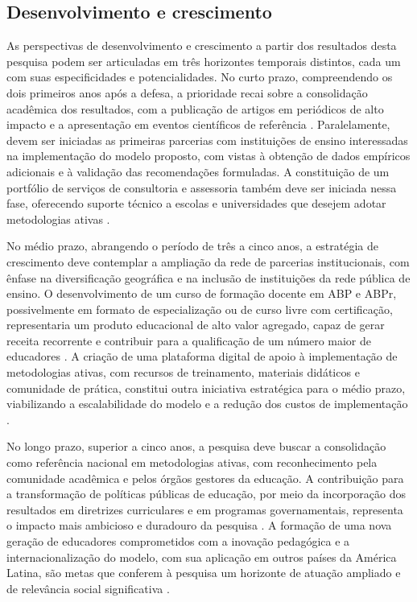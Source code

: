 \subsection{Desenvolvimento e crescimento}
\label{subsec:desenvolvimento_crescimento}

As perspectivas de desenvolvimento e crescimento a partir dos resultados desta pesquisa podem ser articuladas em três horizontes temporais distintos, cada um com suas especificidades e potencialidades. No curto prazo, compreendendo os dois primeiros anos após a defesa, a prioridade recai sobre a consolidação acadêmica dos resultados, com a publicação de artigos em periódicos de alto impacto e a apresentação em eventos científicos de referência \cite{MUNHOZ2015}. Paralelamente, devem ser iniciadas as primeiras parcerias com instituições de ensino interessadas na implementação do modelo proposto, com vistas à obtenção de dados empíricos adicionais e à validação das recomendações formuladas. A constituição de um portfólio de serviços de consultoria e assessoria também deve ser iniciada nessa fase, oferecendo suporte técnico a escolas e universidades que desejem adotar metodologias ativas \cite{BENDER2005}.

No médio prazo, abrangendo o período de três a cinco anos, a estratégia de crescimento deve contemplar a ampliação da rede de parcerias institucionais, com ênfase na diversificação geográfica e na inclusão de instituições da rede pública de ensino. O desenvolvimento de um curso de formação docente em ABP e ABPr, possivelmente em formato de especialização ou de curso livre com certificação, representaria um produto educacional de alto valor agregado, capaz de gerar receita recorrente e contribuir para a qualificação de um número maior de educadores \cite{VEIGA2014}. A criação de uma plataforma digital de apoio à implementação de metodologias ativas, com recursos de treinamento, materiais didáticos e comunidade de prática, constitui outra iniciativa estratégica para o médio prazo, viabilizando a escalabilidade do modelo e a redução dos custos de implementação \cite{SOUSA2025}.

No longo prazo, superior a cinco anos, a pesquisa deve buscar a consolidação como referência nacional em metodologias ativas, com reconhecimento pela comunidade acadêmica e pelos órgãos gestores da educação. A contribuição para a transformação de políticas públicas de educação, por meio da incorporação dos resultados em diretrizes curriculares e em programas governamentais, representa o impacto mais ambicioso e duradouro da pesquisa \cite{TEODORO2024}. A formação de uma nova geração de educadores comprometidos com a inovação pedagógica e a internacionalização do modelo, com sua aplicação em outros países da América Latina, são metas que conferem à pesquisa um horizonte de atuação ampliado e de relevância social significativa \cite{BACICH2018}.

